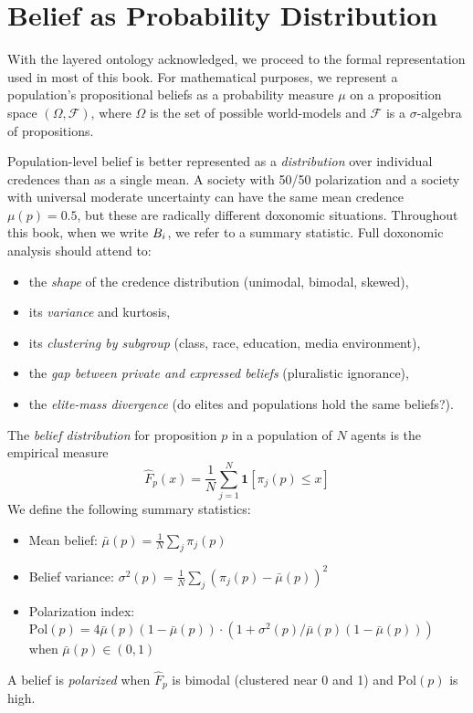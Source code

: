 \section{Belief as Probability Distribution}
\label{sec:ch2-probability}

With the layered ontology acknowledged, we proceed to the formal representation used in most of this book.
For mathematical purposes, we represent a population's propositional beliefs as a probability measure $\mu$ on a proposition space $(\Omega, \mathcal{F})$, where $\Omega$ is the set of possible world-models and $\mathcal{F}$ is a $\sigma$-algebra of propositions.

\begin{remark}
\label{rem:distribution-not-mean}
Population-level belief is better represented as a \emph{distribution} over individual credences than as a single mean.
A society with 50/50 polarization and a society with universal moderate uncertainty can have the same mean credence $\mu(p) = 0.5$, but these are radically different doxonomic situations.
Throughout this book, when we write $B_{i}$, we refer to a summary statistic.
Full doxonomic analysis should attend to:
\begin{itemize}[nosep]
  \item the \emph{shape} of the credence distribution (unimodal, bimodal, skewed),
  \item its \emph{variance} and kurtosis,
  \item its \emph{clustering by subgroup} (class, race, education, media environment),
  \item the \emph{gap between private and expressed beliefs} (pluralistic ignorance),
  \item the \emph{elite-mass divergence} (do elites and populations hold the same beliefs?).
\end{itemize}
\end{remark}

\begin{definition}
\label{def:belief-distribution}
The \emph{belief distribution} for proposition $p$ in a population of $N$ agents is the empirical measure
\[
  \hat{F}_p(x) = \frac{1}{N} \sum_{j=1}^{N} \mathbf{1}[\pi_j(p) \leq x]
\]
We define the following summary statistics:
\begin{itemize}[nosep]
  \item Mean belief: $\bar{\mu}(p) = \frac{1}{N}\sum_j \pi_j(p)$
  \item Belief variance: $\sigma^2(p) = \frac{1}{N}\sum_j (\pi_j(p) - \bar{\mu}(p))^2$
  \item Polarization index: $\mathrm{Pol}(p) = 4\bar{\mu}(p)(1 - \bar{\mu}(p)) \cdot (1 + \sigma^2(p)/\bar{\mu}(p)(1-\bar{\mu}(p)))$ when $\bar{\mu}(p) \in (0,1)$
\end{itemize}
A belief is \emph{polarized} when $\hat{F}_p$ is bimodal (clustered near 0 and 1) and $\mathrm{Pol}(p)$ is high.
\end{definition}

